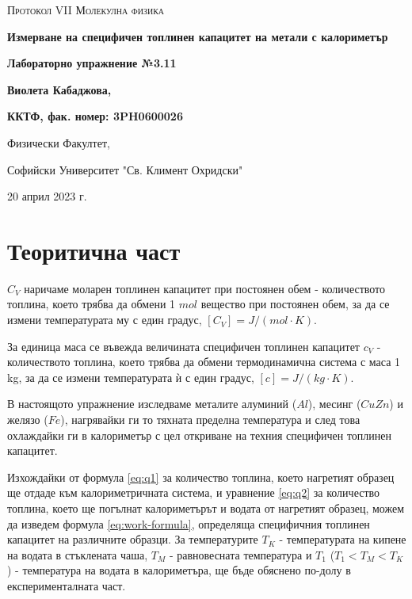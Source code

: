 \documentclass[12pt]{article}
\begin{document}
\begin{titlepage}
	\flushleft
	{\scshape\Large Протокол VII \hspace{2cm} Молекулна физика\par}
	\vspace{4cm}
	{\huge\bfseries Измерване на специфичен топлинен капацитет на метали с калориметър\par}
	\vspace{1cm}
	{\LARGE\bfseries Лабораторно упражнение №3.11\par}
	\vspace{5cm}
    {\LARGE\bfseries Виолета Кабаджова, \par}
    {\large\bfseries ККТФ, фак. номер: 3PH0600026\par}
	\vspace{1cm}
	
	{\large Физически Факултет, 
	
	Софийски Университет "Св. Климент Охридски"
	
    20 април 2023 г.\par}
	
\end{titlepage}

\section{Теоритична част}\label{sec:theoretical-part}
$C_V$ наричаме моларен топлинен капацитет при постоянен обем - количеството топлина, което трябва да обмени 1 $mol$ вещество при постоянен обем, за да се измени температурата му с един градус, $[C_V] = J/(mol\cdot K)$.

За единица маса се въвежда величината специфичен топлинен капацитет $c_V$ - количеството топлина, което трябва да обмени термодинамична система с маса 1 kg, за да се измени температурата ѝ с един градус, $[c] = J/(kg\cdot K)$.

В настоящото упражнение изследваме металите алуминий ($Al$), месинг ($CuZn$) и желязо ($Fe$), нагрявайки ги то тяхната пределна температура и след това охлаждайки ги в калориметър с цел откриване на техния специфичен топлинен капацитет.  

Изхождайки от формула \ref{eq:q1} за количество топлина, което нагретият образец ще отдаде към калориметричната система, и уравнение \ref{eq:q2} за количество топлина, което ще погълнат калориметърът и водата от нагретият образец, можем да изведем формула \ref{eq:work-formula}, определяща специфичния топлинен капацитет на различните образци. За температурите $T_K$ - температурата на кипене на водата в стъклената чаша, $T_M$ - равновесната температура и $T_1$ ($T_1 < T_M < T_K$) - температура на водата в калориметъра, ще бъде обяснено по-долу в експерименталната част.
\end{document}
